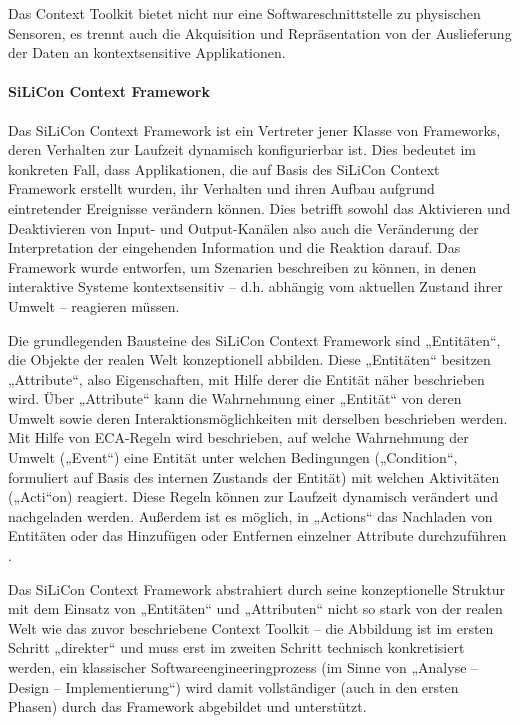Das Context Toolkit bietet nicht nur eine Softwareschnittstelle zu physischen Sensoren, es trennt auch die Akquisition und Repräsentation von der Auslieferung der Daten an kontextsensitive Applikationen.

\paragraph{SiLiCon Context Framework} %
\label{par:silicon_context_framework}

Das SiLiCon Context Framework \citep{Beer03} ist ein Vertreter jener Klasse von Frameworks, deren Verhalten zur Laufzeit dynamisch konfigurierbar ist. Dies bedeutet im konkreten Fall, dass Applikationen, die auf Basis des SiLiCon Context Framework erstellt wurden, ihr Verhalten und ihren Aufbau aufgrund eintretender Ereignisse verändern können. Dies betrifft sowohl das Aktivieren und Deaktivieren von Input- und Output-Kanälen also auch die Veränderung der Interpretation der eingehenden Information und die Reaktion darauf. Das Framework wurde entworfen, um Szenarien beschreiben zu können, in denen interaktive Systeme kontextsensitiv -- d.h. abhängig vom aktuellen Zustand ihrer Umwelt -- reagieren müssen.

Die grundlegenden Bausteine des SiLiCon Context Framework sind „Entitäten“, die Objekte der realen Welt konzeptionell abbilden. Diese „Entitäten“ besitzen „Attribute“, also Eigenschaften, mit Hilfe derer die Entität näher beschrieben wird. Über „Attribute“ kann die Wahrnehmung einer „Entität“ von deren Umwelt sowie deren Interaktionsmöglichkeiten mit derselben beschrieben werden. Mit Hilfe von \gls{ECA}-Regeln  wird beschrieben, auf welche Wahrnehmung der Umwelt („Event“) eine Entität unter welchen Bedingungen („Condition“, formuliert auf Basis des internen Zustands der Entität) mit welchen Aktivitäten („Acti“on) reagiert. Diese Regeln können zur Laufzeit dynamisch verändert und nachgeladen werden. Außerdem ist es möglich, in „Actions“ das Nachladen von Entitäten oder das Hinzufügen oder Entfernen einzelner Attribute durchzuführen \citep[][S. 90]{Oppl04}.

Das SiLiCon Context Framework abstrahiert durch seine konzeptionelle Struktur mit dem Einsatz von „Entitäten“ und „Attributen“ nicht so stark von der realen Welt wie das zuvor beschriebene Context Toolkit -- die Abbildung ist im ersten Schritt „direkter“ und muss erst im zweiten Schritt technisch konkretisiert werden, ein klassischer Softwareengineeringprozess (im Sinne von „Analyse -- Design -- Implementierung“) wird damit vollständiger (auch in den ersten Phasen) durch das Framework abgebildet und unterstützt. 

